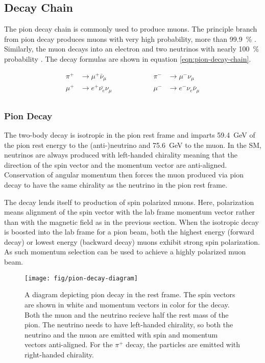 \subsection{Decay Chain}

The pion decay chain is commonly used to produce muons.  The principle branch from pion decay produces muons with very high probability, more than \SI{99.9}{\percent} \cite{pdg-2016}.  Similarly, the muon decays into an electron and two neutrinos with nearly \SI{100}{\percent} probability \cite{pdg-2016}.  The decay formulas are shown in equation \ref{eqn:pion-decay-chain}.

\begin{equation}
\label{eqn:pion-decay-chain}
\begin{aligned}
\pi^+ & \rightarrow \mu^+ \bar{\nu}_\mu  \hspace{5em} & \pi^- & \rightarrow \mu^- \nu_\mu \\
\mu^+ & \rightarrow e^+ \bar{\nu_e} \nu_\mu  \hspace{5em} & \mu^- & \rightarrow e^- \nu_e \bar{\nu}_\mu\\
\end{aligned}
\end{equation}

\subsubsection{Pion Decay}

The two-body decay is isotropic in the pion rest frame and imparts \SI{59.4}{\GeV} of the pion rest energy to the (anti-)neutrino and \SI{75.6}{\GeV} to the muon.  In the SM, neutrinos are always produced with left-handed chirality meaning that the direction of the spin vector and the momentum vector are anti-aligned.  Conservation of angular momentum then forces the muon produced via pion decay to have the same chirality as the neutrino in the pion rest frame.  

The decay lends itself to production of spin polarized muons.  Here, polarization means alignment of the spin vector with the lab frame momentum vector rather than with the magnetic field as in the previous section.  When the isotropic decay is boosted into the lab frame for a pion beam, both the highest energy (forward decay) or lowest energy (backward decay) muons exhibit strong spin polarization.  As such momentum selection can be used to achieve a highly polarized muon beam. 

\begin{figure}
\centering
\texttt{[image: fig/pion-decay-diagram]}
\caption{
    A diagram depicting pion decay in the rest frame.  The spin vectors are shown in white and momentum vectors in color for the decay.  Both the muon and the neutrino recieve half the rest mass of the pion.  The neutrino needs to have left-handed chirality, so both the neutrino and the muon are emitted with spin and momentum vectors anti-aligned.  For the $\pi^+$ decay, the particles are emitted with right-handed chirality.
    \label{fig:muon-decay-diagram}
}
\end{figure}

